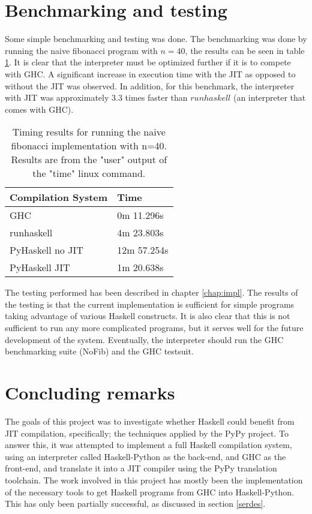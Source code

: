 \section{Benchmarking and testing}

Some simple benchmarking and testing was done. The benchmarking was done by
running the naive fibonacci program with $n=40$, the results can be seen in
table \ref{tab:benchmarks}.
It is clear that the interpreter must be optimized 
further if it is to compete with GHC. A significant increase in execution 
time with the JIT as opposed to without the JIT was observed. In addition,
for this benchmark, the interpreter with JIT was approximately $3.3$ times faster than
$runhaskell$ (an interpreter that comes with GHC).

\begin{table}[H]

\centering
\begin{tabular}{l|l}
\hline
\hline
Compilation System & Time \\
\hline
GHC               & 0m 11.296s  \\
runhaskell        & 4m 23.803s \\ 
PyHaskell no JIT   & 12m 57.254s \\
PyHaskell JIT      & 1m 20.638s \\
\hline
\end{tabular}

\caption{Timing results for running the naive fibonacci implementation with n=40. Results
are from the "user" output of the "time" linux command.}
\label{tab:benchmarks}


\end{table}

The testing performed has been described in chapter \ref{chap:impl}. The results of the 
testing is that the current implementation is sufficient for simple programs taking 
advantage of various Haskell constructs. It is also clear that this is not sufficient
to run any more complicated programs, but it serves well for the future development of
the system. Eventually, the interpreter should run the GHC benchmarking suite (NoFib) and 
the GHC testsuit.

\section{Concluding remarks}


The goals of this project was to investigate whether Haskell could benefit from JIT 
compilation, specifically; the techniques applied by the PyPy project. 
To answer this, it was attempted to implement a full Haskell compilation
system, using an interpreter called Haskell-Python\cite{haskellpython} as the back-end,
and GHC as the front-end, and translate it into a JIT compiler using the PyPy translation
toolchain. The work involved in this project has mostly been the implementation of the necessary
tools to get Haskell programs from GHC into Haskell-Python. This has only been partially
successful, as discussed in section \ref{serdes}.

